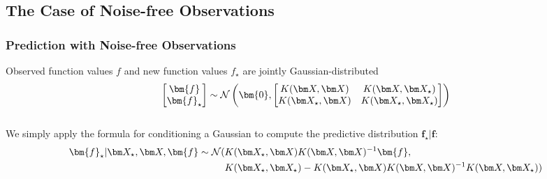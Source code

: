 \subsection{The Case of Noise-free Observations}
\begin{frame}
\tableofcontents[currentsubsection]
\end{frame}


\begin{frame}
\frametitle{Prediction with Noise-free Observations}
Observed function values $f$ and new function values $f_{\star}$ are jointly Gaussian-distributed
\begin{equation*}
\begin{bmatrix}
\bm{f}\\
\bm{f}_{\star}
\end{bmatrix}
\sim \norm\left(
\bm{0},
\begin{bmatrix}
K(\bX, \bX) & K(\bX, \bX_{\star})\\
K(\bX_{\star}, \bX) & K(\bX_{\star}, \bX_{\star})
\end{bmatrix}
\right)
\end{equation*}
\\
We simply apply the formula for conditioning a Gaussian to compute the predictive distribution
$\bm{f}_{\star} | \bm{f}$:
%
\renewcommand\theequation{2.\thedefcounter}
\setcounter{defcounter}{19}
\begin{align}
\bm{f}_{\star} | \bX_{\star}, \bX, \bm{f} \sim \norm(& K(\bX_{\star}, \bX) K(\bX, \bX)\inv \bm{f},\\
\nonumber{} &K(\bX_{\star}, \bX_{\star}) - K(\bX_{\star}, \bX) K(\bX, \bX)\inv K(\bX, \bX_{\star}))
\end{align}
%
\end{frame}



